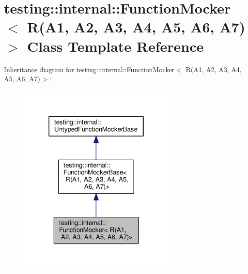 \hypertarget{classtesting_1_1internal_1_1FunctionMocker_3_01R_07A1_00_01A2_00_01A3_00_01A4_00_01A5_00_01A6_00_01A7_08_4}{}\section{testing\+:\+:internal\+:\+:Function\+Mocker$<$ R(A1, A2, A3, A4, A5, A6, A7)$>$ Class Template Reference}
\label{classtesting_1_1internal_1_1FunctionMocker_3_01R_07A1_00_01A2_00_01A3_00_01A4_00_01A5_00_01A6_00_01A7_08_4}


Inheritance diagram for testing\+:\+:internal\+:\+:Function\+Mocker$<$ R(A1, A2, A3, A4, A5, A6, A7)$>$\+:\nopagebreak
\begin{figure}[H]
\begin{center}
\leavevmode
\includegraphics[width=226pt]{classtesting_1_1internal_1_1FunctionMocker_3_01R_07A1_00_01A2_00_01A3_00_01A4_00_01A5_00_01A6_00_01A7_08_4__inherit__graph}
\end{center}
\end{figure}


